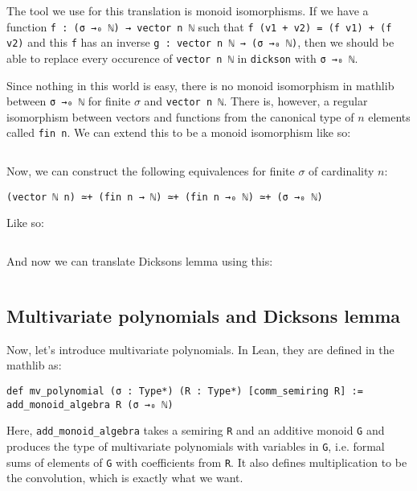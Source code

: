 \documentclass[a4paper, 12pt]{article}
\newcommand{\lean}[1]{\texttt{#1}}
\theoremstyle{changedot}
\theoremstyle{changedotbreak}
\theoremstyle{nonumberplain}
\begin{document}
The tool we use for this translation is monoid isomorphisms. If we have a function \lean{f : (σ →₀ ℕ) → vector n ℕ} such that \lean{f (v1 + v2) = (f v1) + (f v2)} and this \lean{f} has an inverse \lean{g : vector n ℕ → (σ →₀ ℕ)}, then we should be able to replace every occurence of \lean{vector n ℕ} in \lean{dickson} with \lean{σ →₀ ℕ}.

Since nothing in this world is easy, there is no monoid isomorphism in mathlib between \lean{σ →₀ ℕ} for finite $\sigma$ and \lean{vector n ℕ}. There is, however, a regular isomorphism between vectors and functions from the canonical type of $n$ elements called \lean{fin n}. We can extend this to be a monoid isomorphism like so:

\inputminted[firstline=21, lastline=29]{lean}{../src/dickson_add_monoid.lean}

Now, we can construct the following equivalences for finite $\sigma$ of cardinality $n$:

\begin{verbatim}
(vector ℕ n) ≃+ (fin n → ℕ) ≃+ (fin n →₀ ℕ) ≃+ (σ →₀ ℕ)
\end{verbatim}

Like so:

\inputminted[firstline=31, lastline=48]{lean}{../src/dickson_add_monoid.lean}

And now we can translate Dicksons lemma using this:

\inputminted[firstline=50]{lean}{../src/dickson_add_monoid.lean}



\subsection{Multivariate polynomials and Dicksons lemma}

Now, let's introduce multivariate polynomials. In Lean, they are defined in the mathlib as:

\begin{verbatim}
def mv_polynomial (σ : Type*) (R : Type*) [comm_semiring R] := add_monoid_algebra R (σ →₀ ℕ)
\end{verbatim}

Here, \lean{add_monoid_algebra} takes a semiring \lean{R} and an additive monoid \lean{G} and produces the type of multivariate polynomials with variables in \lean{G}, i.e. formal sums of elements of \lean{G} with coefficients from \lean{R}. It also defines multiplication to be the convolution, which is exactly what we want.
\end{document}
